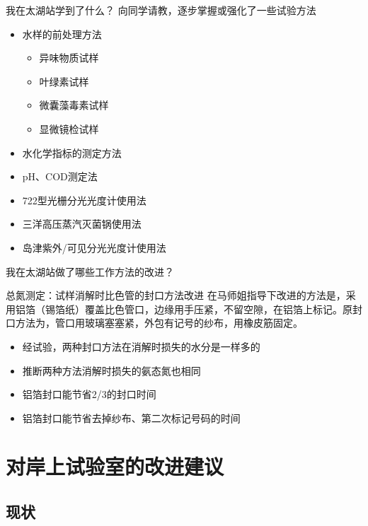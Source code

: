 \documentclass[CJKutf8]{beamer}
\newenvironment{SC}{%
  \CJKfamily{gbsn}%
  \CJKtilde
  \CJKnospace}{}
\begin{document}
\begin{CJK}{UTF8}{}
\begin{SC}
\begin{frame}{我在太湖站学到了什么？}
向同学请教，逐步掌握或强化了一些试验方法
  \begin{itemize}
  \item 水样的前处理方法
     \begin{itemize}
     \item 异味物质试样
     \item 叶绿素试样
     \item 微囊藻毒素试样
     \item 显微镜检试样
     \end{itemize}
  \item 水化学指标的测定方法
  \item pH、COD测定法
  \item 722型光栅分光光度计使用法
  \item 三洋高压蒸汽灭菌锅使用法
  \item 岛津紫外/可见分光光度计使用法
  \end{itemize}
\end{frame}

\begin{frame}{我在太湖站做了哪些工作方法的改进？}
  \begin{block}{总氮测定：试样消解时比色管的封口方法改进}
    在马师姐指导下改进的方法是，采用铝箔（锡箔纸）覆盖比色管口，边缘用手压紧，不留空隙，在铝箔上标记。原封口方法为，管口用玻璃塞塞紧，外包有记号的纱布，用橡皮筋固定。
  \end{block}
  \begin{itemize}
  \item 经试验，两种封口方法在消解时损失的水分是一样多的
  \item 推断两种方法消解时损失的氨态氮也相同
  \item 铝箔封口能节省2/3的封口时间
  \item 铝箔封口能节省去掉纱布、第二次标记号码的时间
  \end{itemize}
\end{frame}

\section{对岸上试验室的改进建议}

\subsection{现状}


\end{SC}
\end{CJK}
\end{document}
